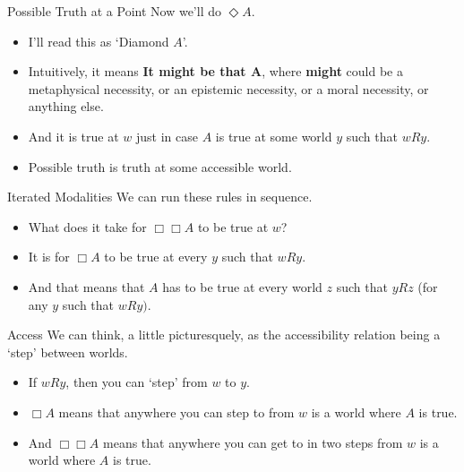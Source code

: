 \documentclass[
  14pt,
  letterpaper,
  ignorenonframetext,
  aspectratio=169,
]{beamer}
\providecommand{\tightlist}{%
  \setlength{\itemsep}{0pt}\setlength{\parskip}{0pt}}\usepackage{longtable,booktabs,array}
\begin{document}
\begin{frame}{Possible Truth at a Point}
\protect\hypertarget{possible-truth-at-a-point}{}
Now we'll do \(\Diamond A\).

\begin{itemize}[<+->]
\tightlist
\item
  I'll read this as `Diamond \(A\)'.
\item
  Intuitively, it means \textbf{It might be that A}, where
  \textbf{might} could be a metaphysical necessity, or an epistemic
  necessity, or a moral necessity, or anything else.
\item
  And it is true at \(w\) just in case \(A\) is true at some world \(y\)
  such that \(wRy\).
\item
  Possible truth is truth at some accessible world.
\end{itemize}
\end{frame}

\begin{frame}{Iterated Modalities}
\protect\hypertarget{iterated-modalities}{}
We can run these rules in sequence.

\begin{itemize}[<+->]
\tightlist
\item
  What does it take for \(\Box \Box A\) to be true at \(w\)?
\item
  It is for \(\Box A\) to be true at every \(y\) such that \(wRy\).
\item
  And that means that \(A\) has to be true at every world \(z\) such
  that \(yRz\) (for any \(y\) such that \(wRy)\).
\end{itemize}
\end{frame}

\begin{frame}{Access}
\protect\hypertarget{access}{}
We can think, a little picturesquely, as the accessibility relation
being a `step' between worlds.

\begin{itemize}[<+->]
\tightlist
\item
  If \(wRy\), then you can `step' from \(w\) to \(y\).
\item
  \(\Box A\) means that anywhere you can step to from \(w\) is a world
  where \(A\) is true.
\item
  And \(\Box \Box A\) means that anywhere you can get to in two steps
  from \(w\) is a world where \(A\) is true.
\end{itemize}
\end{frame}
\end{document}
